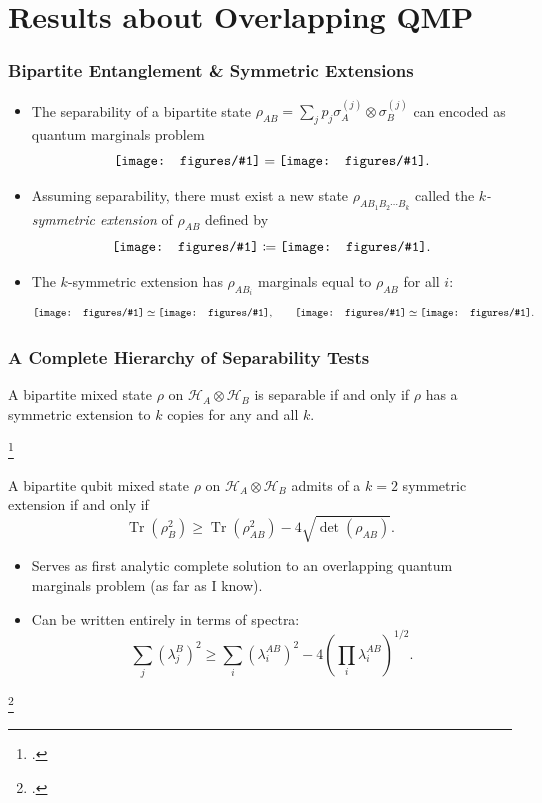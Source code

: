 \documentclass[
    9pt,
    hyperref={bookmarks=false, colorlinks=false}, %
    xcolor={dvipsnames},
]{beamer}
\DeclareMathOperator{\Tr}{Tr}
\newcommand{\incstr}[1]{\vcenter{\hbox{\texttt{[image: figures/\#1]}}}} %
\begin{document}
\section{Results about Overlapping QMP}
\begin{frame}
    \frametitle{Bipartite Entanglement \& Symmetric Extensions}
    \begin{itemize}
        \item The separability of a bipartite state $\rho_{AB} = {\sum}_{j} p_j \sigma_A^{(j)}\otimes \sigma_B^{(j)}$ can encoded as quantum marginals problem
            \[ \incstr{bipartite.pdf} = \incstr{sep_class_wire.pdf} .\]
        \item Assuming separability, there must exist a new state $\rho_{AB_1B_2\cdots B_k}$ called the \textit{$k$-symmetric extension} of $\rho_{AB}$ defined by
            \[ \incstr{kpartite.pdf} \coloneqq \incstr{sep_ext_k.pdf}. \]
        \item The $k$-symmetric extension has $\rho_{AB_i}$ marginals equal to $\rho_{AB}$ for all $i$:
            \[ \incstr{bipartite.pdf} \simeq \incstr{kpartite_marg.pdf}, \qquad \incstr{kpartite.pdf} \simeq \incstr{kpartite_sym.pdf}. \]
    \end{itemize}
\end{frame}

\begin{frame}
    \frametitle{A Complete Hierarchy of Separability Tests}
    \begin{theorem}
        A bipartite mixed state $\rho$ on $\mathcal H_A \otimes \mathcal H_B$ is separable if and only if $\rho$ has a symmetric extension to $k$ copies for any and all $k$.
    \end{theorem}
    \footcitetext{doherty2004complete}
    \begin{theorem}
        A bipartite qubit mixed state $\rho$ on $\mathcal H_A \otimes \mathcal H_B$ admits of a $k=2$ symmetric extension if and only if
        \[ \Tr(\rho_{B}^2) \geq \Tr(\rho^2_{AB}) - 4 \sqrt{\det(\rho_{AB})}. \]
    \end{theorem}
    \begin{itemize}
        \item Serves as first analytic complete solution to an overlapping quantum marginals problem (as far as I know).
        \item Can be written entirely in terms of spectra:
        \[ {\sum}_{j}(\lambda_j^{B})^2 \geq {\sum}_{i}(\lambda_i^{AB})^2 - 4 \left({\prod}_{i} \lambda_i^{AB}\right)^{1/2}. \]
    \end{itemize}
    \footcitetext{chen2014symmetric}
\end{frame}
\end{document}
